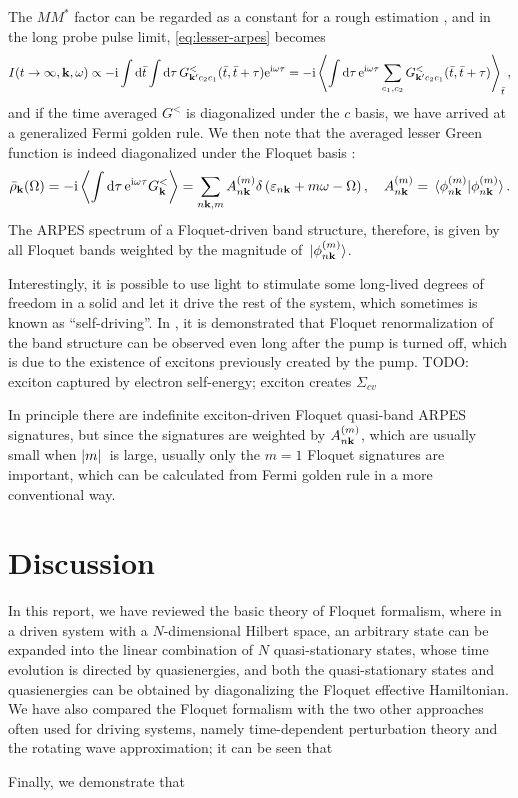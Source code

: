 \documentclass[hyperref, a4paper]{article}
\newcommand*{\ii}{\mathrm{i}}
\newcommand*{\ee}{\mathrm{e}}
\begin{document}
The $MM^*$ factor can be regarded as a constant for a rough estimation 
\cite{freericks2009theoretical,chan2023giant},
and in the long probe pulse limit, \eqref{eq:lesser-arpes} becomes 
\begin{equation}
    I(t \to \infty, \vb{k}, \omega) \propto
    - \ii \int \dd{\bar{t}} \int \dd{\tau} G^<_{\vb{k}' c_2 c_1}(\bar{t}, \bar{t} + \tau) \ee^{\ii \omega \tau} 
    = - \ii \expval{\int \dd{\tau} \ee^{\ii \omega \tau}
    \sum_{c_1, c_2} G^<_{\vb{k}' c_2 c_1}(\bar{t}, \bar{t} + \tau)}_{\bar{t}},
\end{equation} 
and if the time averaged $G^<$ is diagonalized under the $c$ basis, 
we have arrived at a generalized Fermi golden rule.
We then note that the averaged lesser Green function is indeed diagonalized under the Floquet basis \cite{rudner2020floquet}:
\begin{equation}
    \bar{\rho}_{\vb{k}}(\Omega) = - \ii \expval{\int \dd{\tau} \ee^{\ii \omega \tau} G^<_{\vb{k}}} 
    =\sum_{n \vb{k}, m} A_{n \vb{k}}^{(m)} \delta\left(\varepsilon_{n \vb{k}} +m \omega-\Omega\right), 
    \quad A_{n \vb{k}}^{(m)}= \braket*{\phi_{n \vb{k}}^{(m)}}{\phi_{n \vb{k}}^{(m)}}.
\end{equation}
The ARPES spectrum of a Floquet-driven band structure, therefore, 
is given by all Floquet bands weighted by the magnitude of $\ket*{\phi_{n \vb{k}}^{(m)}}$.

Interestingly, it is possible to use light to stimulate 
some long-lived degrees of freedom in a solid 
and let it drive the rest of the system, 
which sometimes is known as ``self-driving''.
In \cite{chan2023giant}, it is demonstrated that 
Floquet renormalization of the band structure can be observed 
even long after the pump is turned off, 
which is due to the existence of excitons previously created by the pump.
TODO: exciton captured by electron self-energy; 
exciton creates $\Sigma_{cv}$

In principle there are indefinite exciton-driven Floquet quasi-band ARPES signatures,
but since the signatures are weighted by $A^{(m)}_{n \vb{k}}$,
which are usually small when $\abs*{m}$ is large, 
usually only the $m=1$ Floquet signatures are important,
which can be calculated from Fermi golden rule in a more conventional way.


\section{Discussion}

In this report,
we have reviewed the basic theory of Floquet formalism, 
where in a driven system with a $N$-dimensional Hilbert space, 
an arbitrary state can be expanded into 
the linear combination of $N$ quasi-stationary states, 
whose time evolution is directed by quasienergies,
and both the quasi-stationary states and quasienergies can be obtained 
by diagonalizing the Floquet effective Hamiltonian.
We have also compared the Floquet formalism with the two other approaches often used for driving systems, 
namely time-dependent perturbation theory and the rotating wave approximation;
it can be seen that 

Finally, we demonstrate that 

\printbibliography
\end{document}
